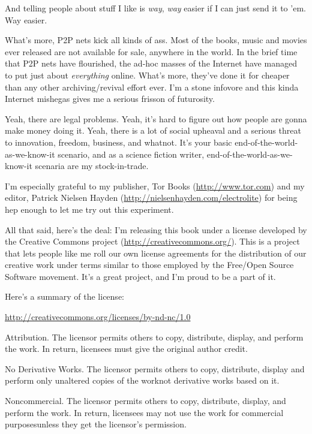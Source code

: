 And telling people about stuff I like is \emph{way}, \emph{way}
easier if I can just send it to 'em. Way easier.

What's more, P2P nets kick all kinds of ass. Most of the books,
music and movies ever released are not available for sale, anywhere
in the world. In the brief time that P2P nets have flourished, the
ad-hoc masses of the Internet have managed to put just about
\emph{everything} online. What's more, they've done it for cheaper
than any other archiving/revival effort ever. I'm a stone infovore
and this kinda Internet mishegas gives me a serious frisson of
futurosity.

Yeah, there are legal problems. Yeah, it's hard to figure out how
people are gonna make money doing it. Yeah, there is a lot of
social upheaval and a serious threat to innovation, freedom,
business, and whatnot. It's your basic
end-of-the-world-as-we-know-it scenario, and as a science fiction
writer, end-of-the-world-as-we-know-it scenaria are my
stock-in-trade.

I'm especially grateful to my publisher, Tor Books
(\href{http://www.tor.com/}{http://www.tor.com}) and my editor,
Patrick Nielsen Hayden
(\href{http://nielsenhayden.com/electrolite}{http://nielsenhayden.com/electrolite})
for being hep enough to let me try out this experiment.

All that said, here's the deal: I'm releasing this book under a
license developed by the Creative Commons project
(\href{http://creativecommons.org/}{http://creativecommons.org/}).
This is a project that lets people like me roll our own license
agreements for the distribution of our creative work under terms
similar to those employed by the Free/Open Source Software
movement. It's a great project, and I'm proud to be a part of it.

Here's a summary of the license:

\href{http://creativecommons.org/licenses/by-nd-nc/1.0}{http://creativecommons.org/licenses/by-nd-nc/1.0}

Attribution. The licensor permits others to copy, distribute,
display, and perform the work. In return, licensees must give the
original author credit.

No Derivative Works. The licensor permits others to copy,
distribute, display and perform only unaltered copies of the
work{\dash}not derivative works based on it.

Noncommercial. The licensor permits others to copy, distribute,
display, and perform the work. In return, licensees may not use the
work for commercial purposes{\dash}unless they get the licensor's
permission.

